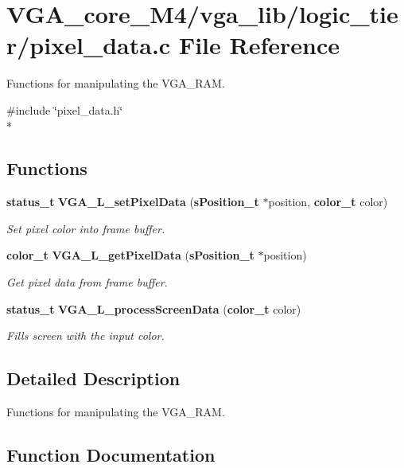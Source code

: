 \section{V\+G\+A\+\_\+core\+\_\+\+M4/vga\+\_\+lib/logic\+\_\+tier/pixel\+\_\+data.c File Reference}
\label{pixel__data_8c}


Functions for manipulating the V\+G\+A\+\_\+\+R\+AM.  


{\ttfamily \#include \char`\"{}pixel\+\_\+data.\+h\char`\"{}}\\*
\subsection*{Functions}
\begin{DoxyCompactItemize}
\item 
{\bf status\+\_\+t} {\bf V\+G\+A\+\_\+\+L\+\_\+set\+Pixel\+Data} ({\bf s\+Position\+\_\+t} $\ast$position, {\bf color\+\_\+t} color)
\begin{DoxyCompactList}\small\item\em Set pixel color into frame buffer. \end{DoxyCompactList}\item 
{\bf color\+\_\+t} {\bf V\+G\+A\+\_\+\+L\+\_\+get\+Pixel\+Data} ({\bf s\+Position\+\_\+t} $\ast$position)
\begin{DoxyCompactList}\small\item\em Get pixel data from frame buffer. \end{DoxyCompactList}\item 
{\bf status\+\_\+t} {\bf V\+G\+A\+\_\+\+L\+\_\+process\+Screen\+Data} ({\bf color\+\_\+t} color)
\begin{DoxyCompactList}\small\item\em Fills screen with the input color. \end{DoxyCompactList}\end{DoxyCompactItemize}


\subsection{Detailed Description}
Functions for manipulating the V\+G\+A\+\_\+\+R\+AM. 



\subsection{Function Documentation}
